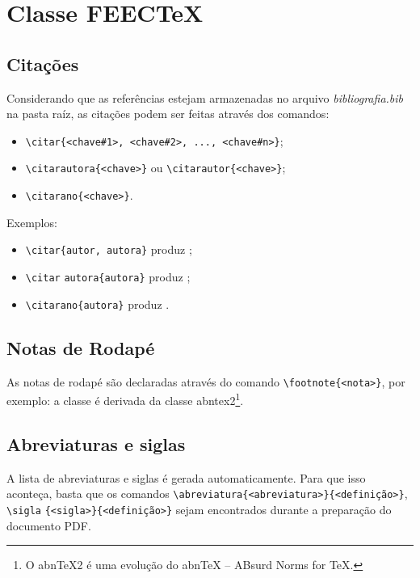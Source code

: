 \chapter{Classe FEECTeX}
\label{cap1}

\section{Citações}

Considerando que as referências estejam armazenadas no arquivo \textit{bibliografia.bib} na pasta raíz, as citações podem ser feitas através dos comandos:

\begin{itemize}
    \item \verb|\citar{<chave#1>, <chave#2>, ..., <chave#n>}|;
    \item \verb|\citarautora{<chave>}| ou \verb|\citarautor{<chave>}|;
    \item \verb|\citarano{<chave>}|.
\end{itemize}

Exemplos:

\begin{itemize}
    \item \verb|\citar{autor, autora}| produz ;
    \item \verb|\citar| \verb|autora{autora}| produz ;
    \item \verb|\citarano{autora}| produz .
\end{itemize}

\section{Notas de Rodapé}

As notas de rodapé são declaradas através do comando \verb|\footnote{<nota>}|, por exemplo: a classe \feectex é derivada da classe abntex2\footnote{O abnTeX2 é uma evolução do abnTeX -- ABsurd Norms for TeX.}.

\section{Abreviaturas e siglas}

A lista de abreviaturas e siglas é gerada automaticamente. Para que isso aconteça, basta que os comandos \verb|\abreviatura{<abreviatura>}|\verb|{<definição>}|, \verb|\sigla| \verb|{<sigla>}{<definição>}| sejam encontrados durante a preparação do documento PDF.

